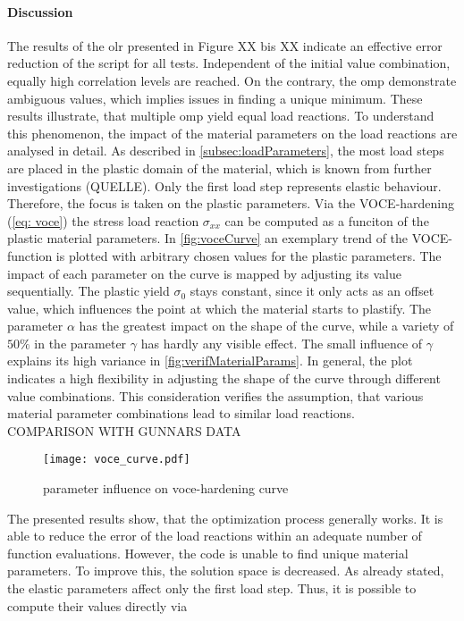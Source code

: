 \paragraph{Discussion}
The results of the \acrlong{olr} presented in Figure XX bis XX indicate an effective error reduction of the script for all tests. Independent of the initial value combination, equally high correlation levels are reached. On the contrary, the \acrlong{omp} demonstrate ambiguous values, which implies issues in finding a unique minimum. These results illustrate, that multiple \acrlong{omp} yield equal load reactions. To understand this phenomenon, the impact of the material parameters on the load reactions are analysed in detail. As described in \autoref{subsec:loadParameters}, the most load steps are placed in the plastic domain of the material, which is known from further investigations (QUELLE). Only the first load step represents elastic behaviour. Therefore, the focus is taken on the plastic parameters. Via the VOCE-hardening (\autoref{eq: voce}) the stress load reaction $\sigma_{xx}$ can be computed as a funciton of the plastic material parameters.
In \autoref{fig:voceCurve} an exemplary trend of the VOCE-function is plotted with arbitrary chosen values for the plastic parameters. The impact of each parameter on the curve is mapped by adjusting its value sequentially. The plastic yield $\sigma_0$ stays constant, since it only acts as an offset value, which influences the point at which the material starts to plastify. The parameter $\alpha$ has the greatest impact on the shape of the curve, while a variety of \(50\%\) in the parameter $\gamma$ has hardly any visible effect. The small influence of $\gamma$ explains its high variance in \autoref{fig:verifMaterialParams}. In general, the plot indicates a high flexibility in adjusting the shape of the curve through different value combinations. This consideration verifies the assumption, that various material parameter combinations lead to similar load reactions. \\

COMPARISON WITH GUNNARS DATA

\begin{figure}[H]
    \centering
    \texttt{[image: voce\_curve.pdf]}
    \caption{parameter influence on voce-hardening curve}
    \label{fig:voceCurve}
\end{figure}

The presented results show, that the optimization process generally works. It is able to reduce the error of the load reactions within an adequate number of function evaluations. However, the code is unable to find unique material parameters. To improve this, the solution space is decreased. As already stated, the elastic parameters affect only the first load step. Thus, it is possible to compute their values directly via

